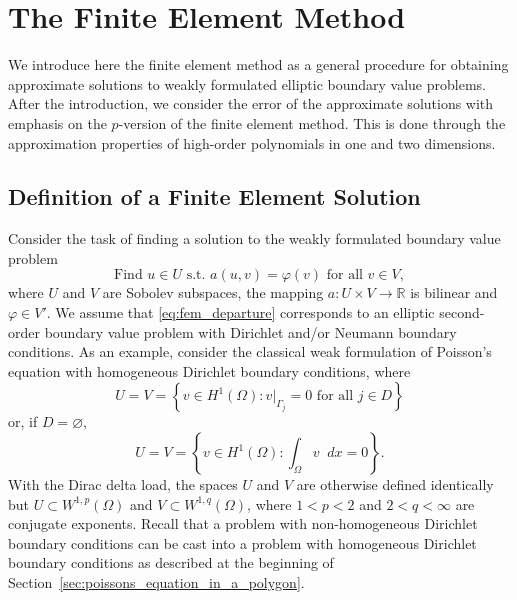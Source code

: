 \documentclass[english, 12pt, a4paper, sci, utf8, a-2b, online]{aaltothesis}
\theoremstyle{definition}
\theoremstyle{plain}
\newcommand*\diff{\mathop{}\!d}
\numberwithin{equation}{section}
\begin{document}
\clearpage

\section{The Finite Element Method}
\label{sec:finite_element_method}

We introduce here the finite element method as a general procedure for obtaining
approximate solutions to weakly formulated elliptic boundary value problems.
After the introduction, we consider the error of the approximate solutions
with emphasis on the $p$-version of the finite element method.
This is done through the approximation properties of high-order polynomials
in one and two dimensions.


\subsection{Definition of a Finite Element Solution}
\label{subsec:basic_properties_of_finite_element_solutions}

Consider the task of finding a solution to the weakly formulated
boundary value problem
\begin{equation}
    \label{eq:fem_departure}
    \text{Find } u \in U \text{ s.t.\ }
    a(u,v) = \varphi(v) \text{ for all } v \in V,
\end{equation}
where $U$ and $V$ are Sobolev subspaces, the mapping $a: U \times V \to \mathbb{R}$
is bilinear and $\varphi \in V'$.
We assume that \eqref{eq:fem_departure} corresponds to an
elliptic second-order boundary value problem
with Dirichlet and/or Neumann boundary conditions.
As an example, consider the classical weak formulation of Poisson's
equation with homogeneous Dirichlet boundary conditions, where
\begin{equation*}
    U = V
    = \left\{ v \in H^1(\Omega)
        : v|_{\Gamma_j} = 0 \text{ for all } j \in D \right\}
\end{equation*}
or, if $D = \varnothing$,
\begin{equation*}
    U = V
    = \left\{ v \in H^1(\Omega) : \int_{\Omega} v \diff x = 0 \right\}.
\end{equation*}
With the Dirac delta load, the spaces $U$ and $V$ are otherwise
defined identically but $U \subset W^{1,p}(\Omega)$
and $V \subset W^{1,q}(\Omega)$, where
$1 < p < 2$ and $2 < q < \infty$ are conjugate exponents.
Recall that a problem with non-homogeneous Dirichlet boundary
conditions can be cast into a problem with
homogeneous Dirichlet boundary conditions as described
at the beginning of Section~\ref{sec:poissons_equation_in_a_polygon}.
\end{document}
